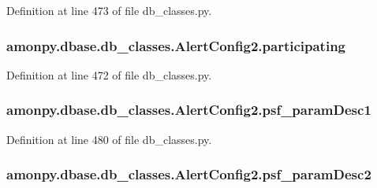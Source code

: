 Definition at line 473 of file db\-\_\-classes.\-py.

\hypertarget{classamonpy_1_1dbase_1_1db__classes_1_1_alert_config2_a67a684e25c13f332b83baf748be6650d}{
\subsubsection[{participating}]{\setlength{\rightskip}{0pt plus 5cm}amonpy.\-dbase.\-db\-\_\-classes.\-Alert\-Config2.\-participating}}\label{classamonpy_1_1dbase_1_1db__classes_1_1_alert_config2_a67a684e25c13f332b83baf748be6650d}


Definition at line 472 of file db\-\_\-classes.\-py.

\hypertarget{classamonpy_1_1dbase_1_1db__classes_1_1_alert_config2_af6d4d813406bf61fab7cd1d2de01766e}{
\subsubsection[{psf\-\_\-param\-Desc1}]{\setlength{\rightskip}{0pt plus 5cm}amonpy.\-dbase.\-db\-\_\-classes.\-Alert\-Config2.\-psf\-\_\-param\-Desc1}}\label{classamonpy_1_1dbase_1_1db__classes_1_1_alert_config2_af6d4d813406bf61fab7cd1d2de01766e}


Definition at line 480 of file db\-\_\-classes.\-py.

\hypertarget{classamonpy_1_1dbase_1_1db__classes_1_1_alert_config2_a8d604b6d92c7d6d1aa5d5a71e87c2f81}{
\subsubsection[{psf\-\_\-param\-Desc2}]{\setlength{\rightskip}{0pt plus 5cm}amonpy.\-dbase.\-db\-\_\-classes.\-Alert\-Config2.\-psf\-\_\-param\-Desc2}}\label{classamonpy_1_1dbase_1_1db__classes_1_1_alert_config2_a8d604b6d92c7d6d1aa5d5a71e87c2f81}


